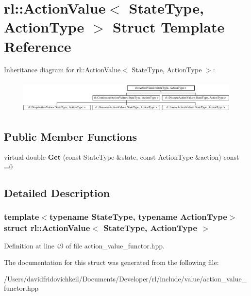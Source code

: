 \hypertarget{structrl_1_1_action_value}{}\section{rl\+:\+:Action\+Value$<$ State\+Type, Action\+Type $>$ Struct Template Reference}
\label{structrl_1_1_action_value}
Inheritance diagram for rl\+:\+:Action\+Value$<$ State\+Type, Action\+Type $>$\+:\begin{figure}[H]
\begin{center}
\leavevmode
\includegraphics[height=1.755486cm]{structrl_1_1_action_value}
\end{center}
\end{figure}
\subsection*{Public Member Functions}
\begin{DoxyCompactItemize}
\item 
\hypertarget{structrl_1_1_action_value_abbe7037de5bce34303d4d85260eb7de5}{}\label{structrl_1_1_action_value_abbe7037de5bce34303d4d85260eb7de5} 
virtual double {\bfseries Get} (const State\+Type \&state, const Action\+Type \&action) const =0
\end{DoxyCompactItemize}


\subsection{Detailed Description}
\subsubsection*{template$<$typename State\+Type, typename Action\+Type$>$\newline
struct rl\+::\+Action\+Value$<$ State\+Type, Action\+Type $>$}



Definition at line 49 of file action\+\_\+value\+\_\+functor.\+hpp.



The documentation for this struct was generated from the following file\+:\begin{DoxyCompactItemize}
\item 
/\+Users/davidfridovichkeil/\+Documents/\+Developer/rl/include/value/action\+\_\+value\+\_\+functor.\+hpp\end{DoxyCompactItemize}
